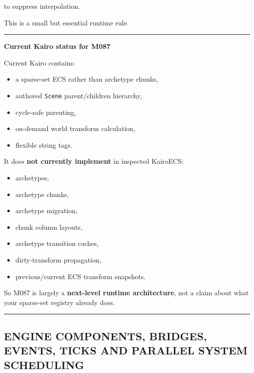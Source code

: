 to suppress interpolation.

This is a small but essential runtime rule.

\begin{center}\rule{0.5\linewidth}{0.5pt}\end{center}

\textbf{Current Kairo status for M087}

Current Kairo contains:

\begin{itemize}
\tightlist
\item
  a sparse-set ECS rather than archetype chunks,
\item
  authored \texttt{Scene} parent/children hierarchy,
\item
  cycle-safe parenting,
\item
  on-demand world transform calculation,
\item
  flexible string tags.
\end{itemize}

It does \textbf{not currently implement} in inspected KairoECS:

\begin{itemize}
\tightlist
\item
  archetypes,
\item
  archetype chunks,
\item
  archetype migration,
\item
  chunk column layouts,
\item
  archetype transition caches,
\item
  dirty-transform propagation,
\item
  previous/current ECS transform snapshots.
\end{itemize}

So M087 is largely a \textbf{next-level runtime architecture}, not a claim about what your sparse-set registry already does.

\begin{center}\rule{0.5\linewidth}{0.5pt}\end{center}

\subsection{ENGINE COMPONENTS, BRIDGES, EVENTS, TICKS AND PARALLEL SYSTEM SCHEDULING}\label{05-engine-i-ch016-engine-components-bridges-events-ticks-and-parallel-system-scheduling}

\hypertarget{05-engine-i-ch016-engine-components-bridges-events-ticks-and-parallel-system-scheduling}{}

